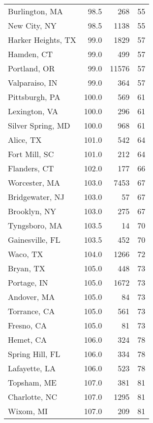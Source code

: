 \begin{longtable}{lrrr}
Burlington, MA       &    98.5 &    268 &    55 \\
New City, NY         &    98.5 &   1138 &    55 \\
Harker Heights, TX   &    99.0 &   1829 &    57 \\
Hamden, CT           &    99.0 &    499 &    57 \\
Portland, OR         &    99.0 &  11576 &    57 \\
Valparaiso, IN       &    99.0 &    364 &    57 \\
Pittsburgh, PA       &   100.0 &    569 &    61 \\
Lexington, VA        &   100.0 &    296 &    61 \\
Silver Spring, MD    &   100.0 &    968 &    61 \\
Alice, TX            &   101.0 &    542 &    64 \\
Fort Mill, SC        &   101.0 &    212 &    64 \\
Flanders, CT         &   102.0 &    177 &    66 \\
Worcester, MA        &   103.0 &   7453 &    67 \\
Bridgewater, NJ      &   103.0 &     57 &    67 \\
Brooklyn, NY         &   103.0 &    275 &    67 \\
Tyngsboro, MA        &   103.5 &     14 &    70 \\
Gainesville, FL      &   103.5 &    452 &    70 \\
Waco, TX             &   104.0 &   1266 &    72 \\
Bryan, TX            &   105.0 &    448 &    73 \\
Portage, IN          &   105.0 &   1672 &    73 \\
Andover, MA          &   105.0 &     84 &    73 \\
Torrance, CA         &   105.0 &    561 &    73 \\
Fresno, CA           &   105.0 &     81 &    73 \\
Hemet, CA            &   106.0 &    324 &    78 \\
Spring Hill, FL      &   106.0 &    334 &    78 \\
Lafayette, LA        &   106.0 &    523 &    78 \\
Topsham, ME          &   107.0 &    381 &    81 \\
Charlotte, NC        &   107.0 &   1295 &    81 \\
Wixom, MI            &   107.0 &    209 &    81 \\

\end{longtable}
